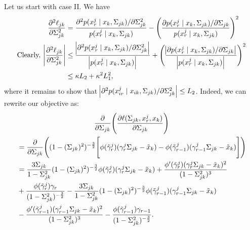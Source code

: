 \begin{condition}
    Let us start with case II. We have
    \begin{equation}\label{hessian_case2} 
        \begin{split}
            \frac{\partial^2\ell_{jk}}{\partial \Sigma_{jk}^{2}} &= \frac{\partial^2 p(x^j_{r} \mid x_{k}, \Sigma_{jk})/\partial \Sigma_{jk}^{2}}{p(x^j_{r} \mid x_{k}, \Sigma_{jk})} - \Bigg(\frac{\partial p(x^j_{r} \mid x_{k}, \Sigma_{jk}) / \partial \Sigma_{jk}}{p(x^j_{r} \mid x_{k}, \Sigma_{jk})}\Bigg)^2 \\
            \text{Clearly, } \abs{\frac{\partial^2\ell_{jk}}{\partial \Sigma_{jk}^{2}}} &\leq \frac{\abs{\partial^2 p(x^j_{r} \mid x_{k}, \Sigma_{jk})/\partial \Sigma_{jk}^{2}}}{\abs{p(x^j_{r} \mid x_{k}, \Sigma_{jk})}} + \Bigg( \frac{\abs{\partial p(x^j_{r} \mid x_{k}, \Sigma_{jk}) / \partial \Sigma_{jk}}}{\abs{p(x^j_{r} \mid x_{k}, \Sigma_{jk})}} \Bigg)^2 \\
            &\leq \kappa L_2 + \kappa^2 L_1^2,
        \end{split}
    \end{equation}
    where it remains to show that $\abs{\partial^2 p(x^j_{ir} \mid x_{ik}, \Sigma_{jk})/\partial \Sigma_{jk}^{2}} \leq L_2$. Indeed, we can rewrite our objective as:
    \begin{multline}\label{second_derivative_case2}
            \frac{\partial}{\partial \Sigma_{jk}} \Bigg(\frac{\partial\ell(\Sigma_{jk}, x^j_r,x_k)}{\partial \Sigma_{jk}}\Bigg) \\
            \begin{aligned}
            &= \frac{\partial}{\partial \Sigma_{jk}}\Bigg( (1-(\Sigma_{jk})^2)^{-\frac{3}{2}} \Bigg[\phi({\Tilde{\gamma}}^j_{r})({\gamma}^j_r\Sigma_{jk} - {\Tilde{x}}_{k}) - \phi({\Tilde{\gamma}}^j_{r-1})({\gamma}^j_{r-1}\Sigma_{jk} - {\Tilde{x}}_{k})\Bigg] \Bigg) \\
            &= \frac{3\Sigma_{jk}}{1-\Sigma_{jk}^2} (1-(\Sigma_{jk})^2)^{-\frac{3}{2}} \phi({\Tilde{\gamma}}^j_{r})({\gamma}^j_r\Sigma_{jk} - {\Tilde{x}}_{k}) + \frac{\phi^\prime({\Tilde{\gamma}}^j_{r})({\gamma}^j_r\Sigma_{jk} - {\Tilde{x}}_{k})^2}{(1-\Sigma_{jk}^2)^3} \\
            &+ \frac{\phi({\Tilde{\gamma}}^j_{r}){\gamma}_{r}}{(1-\Sigma_{jk}^2)^{-\frac{3}{2}}} - \frac{3\Sigma_{jk}}{1-\Sigma_{jk}^2} (1-(\Sigma_{jk})^2)^{-\frac{3}{2}} \phi({\Tilde{\gamma}}^j_{r-1})({\gamma}^j_{r-1}\Sigma_{jk} - {\Tilde{x}}_{k}) \\
            &-  \frac{\phi^\prime({\Tilde{\gamma}}^j_{r-1})({\gamma}^j_{r-1}\Sigma_{jk} - {\Tilde{x}}_{k})^2}{(1-\Sigma_{jk}^2)^3} - \frac{\phi({\Tilde{\gamma}}^j_{r-1}){\gamma}_{r-1}}{(1-\Sigma_{jk}^2)^{-\frac{3}{2}}}.

\end{aligned}
\end{multline}
\end{condition}
